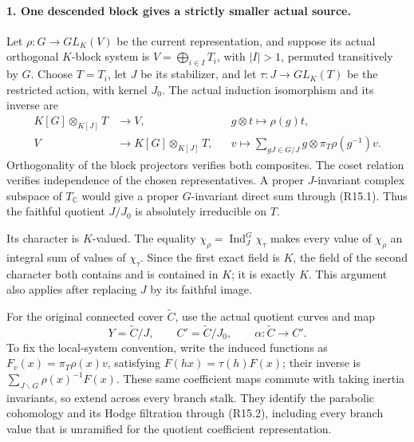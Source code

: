 \paragraph{1. One descended block gives a strictly smaller actual source.}
Let \(\rho:G\to GL_K(V)\) be the current representation,
and suppose its actual orthogonal \(K\)-block system is
\(V=\bigoplus_{i\in I}T_i\), with \(|I|>1\), permuted
transitively by \(G\). Choose \(T=T_i\), let \(J\) be
its stabilizer, and let \(\tau:J\to GL_K(T)\) be the
restricted action, with kernel \(J_0\). The actual induction
isomorphism and its inverse are
\[
 \begin{aligned}
 K[G]\otimes_{K[J]}T&\longrightarrow V,
                 &&g\otimes t\longmapsto\rho(g)t,\\
 V&\longrightarrow K[G]\otimes_{K[J]}T,
                 &&v\longmapsto
      \sum_{gJ\in G/J}g\otimes\pi_T\rho(g^{-1})v.
 \end{aligned}                                              \tag{R15.1}
\]
Orthogonality of the block projectors verifies both
composites. The coset relation verifies independence of
the chosen representatives. A proper \(J\)-invariant
complex subspace of \(T_{\mathbb C}\) would give a proper
\(G\)-invariant direct sum through (R15.1). Thus the
faithful quotient \(J/J_0\) is absolutely irreducible
on \(T\).

Its character is \(K\)-valued. The equality
\(\chi_\rho=\operatorname{Ind}_J^G\chi_\tau\) makes every
value of \(\chi_\rho\) an integral sum of values of
\(\chi_\tau\). Since the first exact field is \(K\),
the field of the second character both contains and is
contained in \(K\); it is exactly \(K\). This argument
also applies after replacing \(J\) by its faithful image.

For the original connected cover \(\widetilde C\), use
the actual quotient curves and map
\[
       Y=\widetilde C/J,\qquad
       C'=\widetilde C/J_0,\qquad
       \alpha:\widetilde C\longrightarrow C'.             \tag{R15.2}
\]
To fix the local-system convention, write the induced
functions as \(F_v(x)=\pi_T\rho(x)v\), satisfying
\(F(hx)=\tau(h)F(x)\); their inverse is
\(\sum_{J\backslash G}\rho(x)^{-1}F(x)\).
These same coefficient maps commute with taking inertia
invariants, so extend across every branch stalk. They
identify the parabolic cohomology and its Hodge filtration
through (R15.2), including every branch value that is
unramified for the quotient coefficient representation.

